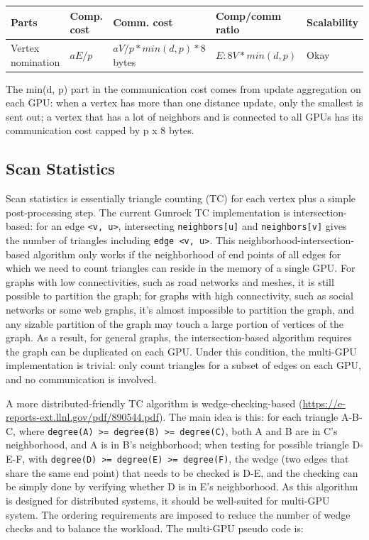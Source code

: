 \documentclass[10pt,oneside]{memoir}
\begin{document}
\begin{longtable}[]{@{}lllll@{}}
\toprule
Parts & Comp. cost & Comm. cost & Comp/comm ratio &
Scalability\tabularnewline
\midrule
\endhead
Vertex nomination & \(aE/p\) & \(aV/p * min(d, p) * 8\) bytes &
\(E : 8V * min(d, p)\) & Okay\tabularnewline
\bottomrule
\end{longtable}

The min(d, p) part in the communication cost comes from update
aggregation on each GPU: when a vertex has more than one distance
update, only the smallest is sent out; a vertex that has a lot of
neighbors and is connected to all GPUs has its communication cost capped
by p x 8 bytes.

\hypertarget{scan-statistics}{%
\subsection{Scan Statistics}\label{scan-statistics}}

Scan statistics is essentially triangle counting (TC) for each vertex
plus a simple post-processing step. The current Gunrock TC
implementation is intersection-based: for an edge
\texttt{\textless{}v,\ u\textgreater{}}, intersecting
\texttt{neighbors{[}u{]}} and \texttt{neighbors{[}v{]}} gives the number
of triangles including \texttt{edge\ \textless{}v,\ u\textgreater{}}.
This neighborhood-intersection-based algorithm only works if the
neighborhood of end points of all edges for which we need to count
triangles can reside in the memory of a single GPU. For graphs with low
connectivities, such as road networks and meshes, it is still possible
to partition the graph; for graphs with high connectivity, such as
social networks or some web graphs, it's almost impossible to partition
the graph, and any sizable partition of the graph may touch a large
portion of vertices of the graph. As a result, for general graphs, the
intersection-based algorithm requires the graph can be duplicated on
each GPU. Under this condition, the multi-GPU implementation is trivial:
only count triangles for a subset of edges on each GPU, and no
communication is involved.

A more distributed-friendly TC algorithm is wedge-checking-based
(\url{https://e-reports-ext.llnl.gov/pdf/890544.pdf}). The main idea is
this: for each triangle A-B-C, where
\texttt{degree(A)\ \textgreater{}=\ degree(B)\ \textgreater{}=\ degree(C)},
both A and B are in C's neighborhood, and A is in B's neighborhood; when
testing for possible triangle D-E-F, with
\texttt{degree(D)\ \textgreater{}=\ degree(E)\ \textgreater{}=\ degree(F)},
the wedge (two edges that share the same end point) that needs to be
checked is D-E, and the checking can be simply done by verifying whether
D is in E's neighborhood. As this algorithm is designed for distributed
systems, it should be well-suited for multi-GPU system. The ordering
requirements are imposed to reduce the number of wedge checks and to
balance the workload. The multi-GPU pseudo code is:
\end{document}
